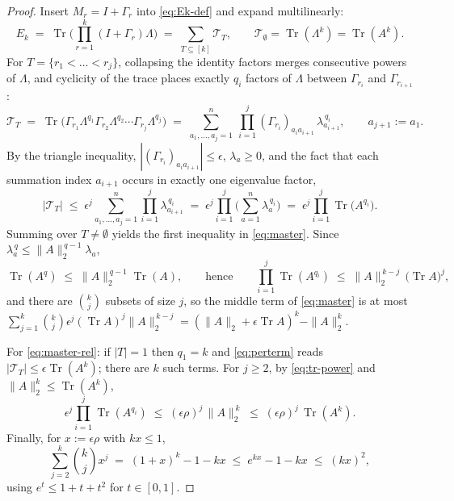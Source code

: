 \documentclass{article}
\theoremstyle{remark}
\begin{document}
\begin{proof}
Insert $M_r = I + \Gamma_r$ into \eqref{eq:Ek-def} and expand multilinearly:
\begin{equation}\label{eq:expansion}
E_k \;=\; \operatorname{Tr}\!\Big( \prod_{r=1}^{k} (I + \Gamma_r) \Lambda \Big)
\;=\; \sum_{T \subseteq [k]} \mathcal{T}_T,
\qquad
\mathcal{T}_\emptyset = \operatorname{Tr}(\Lambda^k) = \operatorname{Tr}(A^k).
\end{equation}
For $T = \{r_1 < \dots < r_j\}$, collapsing the identity factors merges consecutive powers of $\Lambda$, and cyclicity of the trace places exactly $q_i$ factors of $\Lambda$ between $\Gamma_{r_i}$ and $\Gamma_{r_{i+1}}$:
\begin{equation}\label{eq:term-index}
\mathcal{T}_T
\;=\; \operatorname{Tr}\!\big( \Gamma_{r_1} \Lambda^{q_1} \Gamma_{r_2} \Lambda^{q_2} \cdots \Gamma_{r_j} \Lambda^{q_j} \big)
\;=\; \sum_{a_1,\dots,a_j = 1}^{n}\ \prod_{i=1}^{j} (\Gamma_{r_i})_{a_i a_{i+1}}\, \lambda_{a_{i+1}}^{\,q_i},
\qquad a_{j+1} := a_1 .
\end{equation}
By the triangle inequality, $|(\Gamma_{r_i})_{a_i a_{i+1}}| \le \epsilon$, $\lambda_a \ge 0$, and the fact that each summation index $a_{i+1}$ occurs in exactly one eigenvalue factor,
\begin{equation}\label{eq:perterm}
|\mathcal{T}_T| \;\le\; \epsilon^{j} \sum_{a_1,\dots,a_j=1}^{n} \prod_{i=1}^{j} \lambda_{a_{i+1}}^{\,q_i}
\;=\; \epsilon^{j} \prod_{i=1}^{j} \Big( \sum_{a=1}^{n} \lambda_a^{\,q_i} \Big)
\;=\; \epsilon^{j} \prod_{i=1}^{j} \operatorname{Tr}\!\big( A^{q_i} \big).
\end{equation}
Summing over $T \neq \emptyset$ yields the first inequality in \eqref{eq:master}. Since $\lambda_a^{\,q} \le \|A\|_2^{\,q-1} \lambda_a$,
\begin{equation}\label{eq:tr-power}
\operatorname{Tr}(A^{q}) \;\le\; \|A\|_2^{\,q-1} \operatorname{Tr}(A),
\qquad \text{hence} \qquad
\prod_{i=1}^{j} \operatorname{Tr}(A^{q_i}) \;\le\; \|A\|_2^{\,k-j}\, \big(\operatorname{Tr} A\big)^{j},
\end{equation}
and there are $\binom{k}{j}$ subsets of size $j$, so the middle term of \eqref{eq:master} is at most
$\sum_{j=1}^{k} \binom{k}{j} \epsilon^j (\operatorname{Tr} A)^j \|A\|_2^{\,k-j} = (\|A\|_2 + \epsilon\operatorname{Tr} A)^k - \|A\|_2^k$.

For \eqref{eq:master-rel}: if $|T| = 1$ then $q_1 = k$ and \eqref{eq:perterm} reads $|\mathcal{T}_T| \le \epsilon \operatorname{Tr}(A^k)$; there are $k$ such terms. For $j \ge 2$, by \eqref{eq:tr-power} and $\|A\|_2^k \le \operatorname{Tr}(A^k)$,
\begin{equation}
\epsilon^{j} \prod_{i=1}^{j} \operatorname{Tr}(A^{q_i})
\;\le\; (\epsilon\rho)^{j}\, \|A\|_2^{\,k}
\;\le\; (\epsilon\rho)^{j}\, \operatorname{Tr}(A^k).
\end{equation}
Finally, for $x := \epsilon\rho$ with $kx \le 1$,
\begin{equation}
\sum_{j=2}^{k} \binom{k}{j} x^j \;=\; (1+x)^k - 1 - kx \;\le\; e^{kx} - 1 - kx \;\le\; (kx)^2 ,
\end{equation}
using $e^t \le 1 + t + t^2$ for $t \in [0,1]$.
\end{proof}
\end{document}
